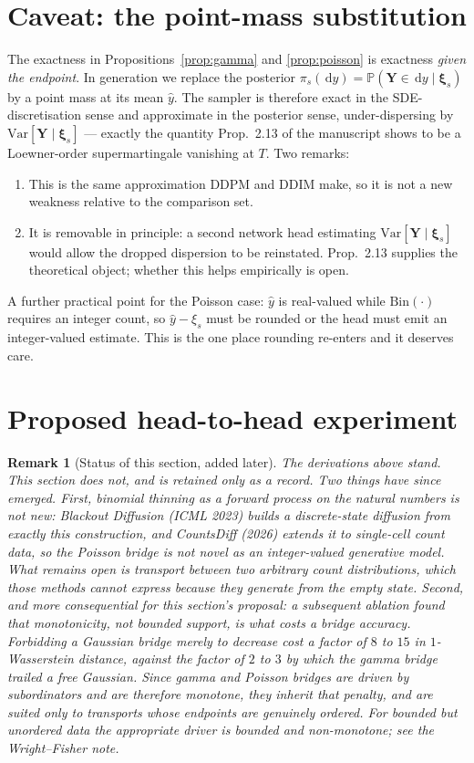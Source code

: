 \documentclass[11pt,a4paper]{article}
\newtheorem{rem}[prop]{Remark}
\def\P{\mathbb{P}}
\def\d{\,\mathrm{d}}
\def\xib{\boldsymbol{\xi}}
\def\Yb{\boldsymbol{Y}}
\begin{document}
\section{Caveat: the point-mass substitution}
\label{sec:caveat}

The exactness in Propositions~\ref{prop:gamma} and \ref{prop:poisson} is exactness
\emph{given the endpoint}. In generation we replace the posterior
$\pi_s(\d y)=\P(\Yb\in\d y\mid\xib_s)$ by a point mass at its mean $\hat y$. The
sampler is therefore exact in the SDE-discretisation sense and approximate in the
posterior sense, under-dispersing by $\mathrm{Var}[\Yb\mid\xib_s]$ --- exactly the
quantity Prop.~2.13 of the manuscript shows to be a Loewner-order supermartingale
vanishing at $T$. Two remarks:
\begin{enumerate}
\item This is the same approximation DDPM and DDIM make, so it is not a new
weakness relative to the comparison set.
\item It is removable in principle: a second network head estimating
$\mathrm{Var}[\Yb\mid\xib_s]$ would allow the dropped dispersion to be reinstated.
Prop.~2.13 supplies the theoretical object; whether this helps empirically is open.
\end{enumerate}
A further practical point for the Poisson case: $\hat y$ is real-valued while
$\mathrm{Bin}(\cdot)$ requires an integer count, so $\hat y-\xi_s$ must be rounded or
the head must emit an integer-valued estimate. This is the one place rounding
re-enters and it deserves care.

\section{Proposed head-to-head experiment}

\begin{rem}[Status of this section, added later]
The derivations above stand. This section does not, and is retained only as a
record. Two things have since emerged. First, binomial thinning as a forward
process on the natural numbers is not new: Blackout Diffusion (ICML 2023) builds
a discrete-state diffusion from exactly this construction, and CountsDiff (2026)
extends it to single-cell count data, so the Poisson bridge is not novel as an
integer-valued generative model. What remains open is transport between two
arbitrary count distributions, which those methods cannot express because they
generate from the empty state. Second, and more consequential for this
section's proposal: a subsequent ablation found that \emph{monotonicity}, not
bounded support, is what costs a bridge accuracy. Forbidding a Gaussian bridge
merely to decrease cost a factor of $8$ to $15$ in $1$-Wasserstein distance,
against the factor of $2$ to $3$ by which the gamma bridge trailed a free
Gaussian. Since gamma and Poisson bridges are driven by subordinators and are
therefore monotone, they inherit that penalty, and are suited only to transports
whose endpoints are genuinely ordered. For bounded but unordered data the
appropriate driver is bounded and non-monotone; see the Wright--Fisher note.
\end{rem}
\end{document}
